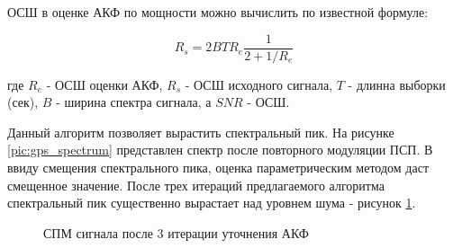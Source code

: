 ОСШ в оценке АКФ по мощности можно вычислить по известной формуле:
\begin{center}
\begin{equation}
	\label{eq:akf_max_eq}
	R_s=2 B T R_e \frac{1}{2+1/R_e}
\end{equation}
\end{center}
где ${R_e}$ - ОСШ оценки АКФ, ${R_s}$ - ОСШ исходного сигнала, ${T}$ - длинна выборки (сек), ${B}$ -  ширина спектра сигнала, 
а ${SNR}$ - ОСШ.

Данный алгоритм позволяет вырастить спектральный пик. На рисунке \ref{pic:gps_spectrum} представлен спектр после повторного
модуляции ПСП. В ввиду смещения спектрального пика, оценка параметрическим методом даст смещенное значение. После трех 
итераций предлагаемого алгоритма спектральный пик существенно вырастает над уровнем шума - рисунок \ref{pic:GPS_spectrum_iter3}.

\begin{figure}[H]
	\center{}
	\caption{СПМ сигнала после 3 итерации уточнения АКФ}
	\label{pic:GPS_spectrum_iter3}
\end{figure}


